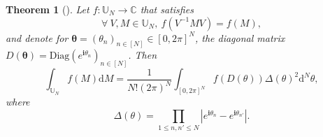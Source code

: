 \documentclass[twoside,11pt]{book}
\newtheorem{theorem}{Theorem}
\numberwithin{theorem}{chapter}
\numberwithin{definition}{chapter}
\numberwithin{proposition}{chapter}
\numberwithin{corollary}{chapter}
\numberwithin{example}{chapter}
\numberwithin{lemma}{chapter}
\numberwithin{assumption}{chapter}
\begin{document}
\begin{theorem}[\cite{Wey46}]
Let $f: \mathbb{U}_{N} \rightarrow \mathbb{C}$ that satisfies
\begin{equation}\label{eq:weil_condition}
\forall \: V, M \in \mathbb{U}_{N}, \:  f(V^{-1}M V) = f(M),
\end{equation}
and denote for $\bm{\theta} = (\theta_{n})_{n \in [N]} \in [0,2\pi]^{N}$, the diagonal matrix $D(\bm{\theta}) = \mathrm{Diag}(e^{\mathbf{i} \theta_{n}})_{n \in [N]}$.
Then
\begin{equation}\label{eq:weyl_integration_formula}
\int_{\mathbb{U}_{N}}f(M) \mathrm{d}M = \frac{1}{N!(2 \pi)^{N}} \int_{[0,2\pi]^{N}} f(D(\theta)) \Delta(\theta)^{2} \mathrm{d}^{N}\theta,
\end{equation}
where 
\begin{equation}
\Delta(\theta) = \prod\limits_{1 \leq n,n' \leq N} | e^{\mathbf{i} \theta_{n}} -e^{\mathbf{i} \theta_{n'}} |.
\end{equation}
\end{theorem}
\end{document}
